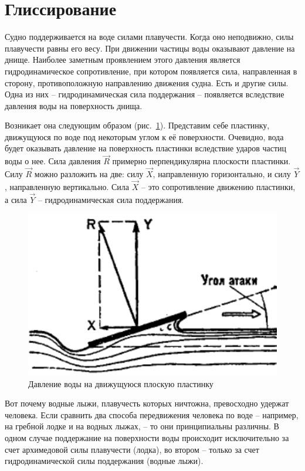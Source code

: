 \documentclass[a4paper, 12pt, twoside, final]{scrbook}
\begin{document}
\section{Глиссирование}

Судно поддерживается на воде силами плавучести. Когда оно неподвижно, силы плавучести равны его весу. При движении частицы воды оказывают давление на днище. Наиболее заметным проявлением этого давления является гидродинамическое сопротивление, при котором появляется сила, направленная в сторону, противоположную направлению движения судна. Есть и другие силы. Одна из них \--- гидродинамическая сила поддержания \--- появляется вследствие давления воды на поверхность днища.

Возникает она следующим образом (рис.~\ref{fig:87}). Представим себе пластинку, движущуюся по воде под некоторым углом к её поверхности. Очевидно, вода будет оказывать давление на поверхность пластинки вследствие ударов частиц воды о нее. Сила давления $\overrightarrow{R}$ примерно перпендикулярна плоскости пластинки. Силу $\overrightarrow{R}$ можно разложить на две: силу $\overrightarrow{X}$, направленную горизонтально, и силу $\overrightarrow{Y}$, направленную вертикально. Сила $\overrightarrow{X}$ \--- это сопротивление движению пластинки, а сила $\overrightarrow{Y}$ \--- гидродинамическая сила поддержания.

\begin{figure}
	\centering
	\includegraphics[scale=1]{87_Davlenie_vody_na_dvizh_plastinu}
	\caption{Давление воды на движущуюся плоскую пластинку}
	\label{fig:87}
\end{figure}

Вот почему водные лыжи, плавучесть которых ничтожна, превосходно удержат человека. Если сравнить два способа передвижения человека по воде \--- например, на гребной лодке и на водных лыжах, \--- то они принципиальны различны. В одном случае поддержание на поверхности воды происходит исключительно за счет архимедовой силы плавучести (лодка), во втором \--- только за счет гидродинамической силы поддержания (водные лыжи).
\end{document}
